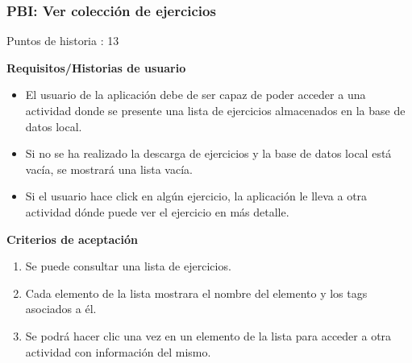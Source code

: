 \documentclass[11pt,a4paper]{report}
\begin{document}
\subsubsection{PBI: Ver colección de ejercicios}
Puntos de historia : 13
\par\textbf{Requisitos/Historias de usuario}
\begin{itemize}
	\item El usuario de la aplicación debe de ser capaz de poder acceder a una actividad donde se presente una lista de ejercicios almacenados en la base de datos local.
	\item Si no se ha realizado la descarga de ejercicios y la base de datos local está vacía, se mostrará una lista vacía.
	\item Si el usuario hace click en algún ejercicio, la aplicación le lleva a otra actividad dónde puede ver el ejercicio en más detalle.
\end{itemize}
\par\textbf{Criterios de aceptación}
\begin{enumerate}
	\item Se puede consultar una lista de ejercicios.
	\item Cada elemento de la lista mostrara el nombre del elemento y los tags asociados a él.
	\item Se podrá hacer clic una vez en un elemento de la lista para acceder a otra actividad con información del mismo.
\end{enumerate}
\end{document}
